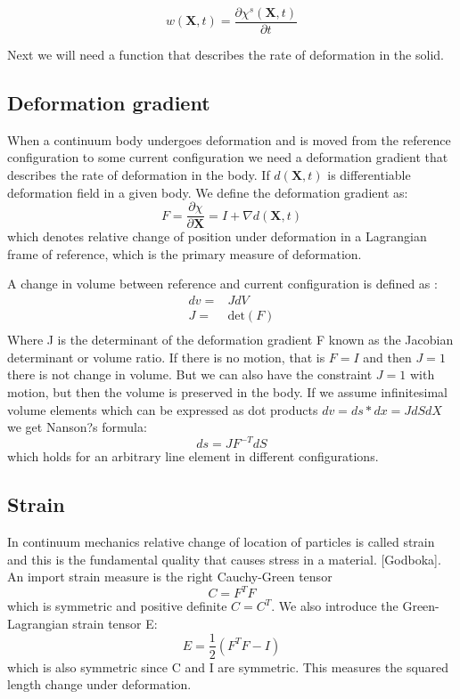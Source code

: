 $$  w(\textbf{X},t) = \frac{\partial \chi^s(\textbf{X},t)}{\partial t}   $$



Next we will need a function that describes the rate of deformation in the solid.
\subsection*{Deformation gradient}
When a continuum body undergoes deformation and is moved from the reference configuration to some current configuration we need a deformation gradient that describes the rate of deformation in the body. 
If $d(\textbf{X},t)$ is differentiable deformation field in a given body. We define the deformation gradient as:  
$$F = \frac{\partial \chi}{\partial \textbf{X}} = I + \nabla d(\textbf{X},t)$$ 
which denotes relative change of position under deformation in a Lagrangian frame of reference, which is the primary measure of deformation. 

A change in volume between reference and current configuration is defined as :
\begin{align*}
dv =& J dV\\
J =& \text{det}(F)\\
\end{align*}
Where J is the determinant of the deformation gradient F known as the Jacobian determinant or volume ratio. If there is no motion, that is $ F = I$ and then $J=1$ there is not change in volume. But we can also have the constraint $J=1$ with motion, but then the volume is preserved in the body. If we assume infinitesimal volume elements which can be expressed as dot products $ dv = ds*dx = J dS dX$ we get Nanson?s formula:
$$ ds = JF^{-T}dS$$
which holds for an arbitrary line element in different configurations.


\subsection*{Strain}
In continuum mechanics relative change of location of particles is called strain and this is the fundamental quality that causes stress in a material. [Godboka]. An import strain measure is the right Cauchy-Green tensor 
$$C = F^TF$$ 
which is symmetric and positive definite $C = C^T$.  We also introduce the Green-Lagrangian strain tensor E:
$$E = \frac{1}{2}(F^TF -I) $$
which is also symmetric since C and I are symmetric. This measures the squared length change under deformation.
		

